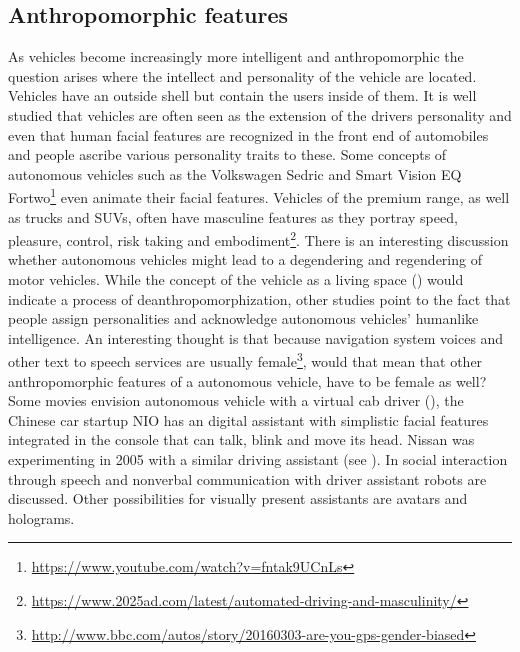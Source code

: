 \subsection{Anthropomorphic features}
As vehicles become increasingly more intelligent and anthropomorphic the question arises where the intellect and personality of the vehicle are located. Vehicles have an outside shell but contain the users inside of them. It is well studied that vehicles are often seen as the extension of the drivers personality and even that human facial features are recognized in the front end of automobiles and people ascribe various personality traits to these\cite{Windhager2008FaceDesigns}. Some concepts of autonomous vehicles such as the Volkswagen Sedric and Smart Vision EQ Fortwo\footnote{\url{https://www.youtube.com/watch?v=fntak9UCnLs}} even animate their facial features. Vehicles of the premium range, as well as trucks and SUVs, often have masculine features as they portray speed, pleasure, control, risk taking and embodiment\footnote{\url{https://www.2025ad.com/latest/automated-driving-and-masculinity/}}. There is an interesting discussion whether autonomous vehicles might lead to a degendering and regendering of motor vehicles\cite{Balkmar2018}.
While the concept of the vehicle as a living space () would indicate a process of deanthropomorphization, other studies point to the fact that people assign personalities and acknowledge autonomous vehicles’ humanlike intelligence\cite{Waytz2014}. An interesting thought is that because navigation system voices and other text to speech services are usually female\footnote{\url{http://www.bbc.com/autos/story/20160303-are-you-gps-gender-biased}}, would that mean that other anthropomorphic features of a autonomous vehicle, have to be female as well? 
Some movies envision autonomous vehicle with a virtual cab driver (), the Chinese car startup NIO has an digital assistant with simplistic facial features integrated in the console that can talk, blink and move its head. Nissan was experimenting in 2005 with a similar driving assistant (see ). In \cite{Perchonok2009FacilitatingLiterature} social interaction through speech and nonverbal communication with driver assistant robots are discussed. Other possibilities for visually present assistants are avatars and holograms. 
